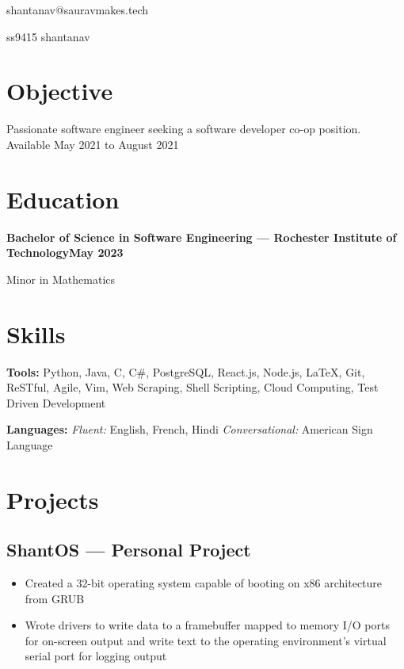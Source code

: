\documentclass[11pt, letterpaper]{article}
\makeatletter
\renewcommand{\maketitle} {
    \thispagestyle{empty}
    \begin{center}    
        {\huge\bfseries \theauthor}

        {\large shantanav@sauravmakes.tech}

        \faGithub \hspace{4px} {\large ss9415} \hspace{10px} \faLinkedin \hspace{4px} {\large shantanav}

    \end{center}
}
\makeatother
\begin{document}
    \author{Shantanav Saurav}
    \maketitle

    \section{Objective}
        Passionate software engineer seeking a software developer co-op position. Available
        May 2021 to August 2021
    \section{Education}
        \textbf{Bachelor of Science in Software Engineering --- 
        Rochester Institute of Technology\hfill May 2023} 
        
        Minor in Mathematics

    \section{Skills}
        \textbf{Tools:}
            Python, Java, C, C\#, PostgreSQL, React.js, Node.js, LaTeX, Git, ReSTful, Agile, Vim,
            Web Scraping, Shell Scripting, Cloud Computing, Test Driven Development

        \textbf{Languages:} \hspace{0px}
            \emph{Fluent:} English, French, Hindi \hspace{4px}
            \emph{Conversational:} American Sign Language

    \section{Projects}
        \subsection{ShantOS --- Personal Project}
            \begin{itemize}[nosep]
                \item Created a 32-bit operating system capable of booting on x86 architecture from GRUB 
                \item Wrote drivers to write data to a framebuffer mapped to memory I/O ports for 
                    on-screen output and write text to the operating environment's virtual serial 
                    port for logging output 
            \end{itemize}
\end{document}
